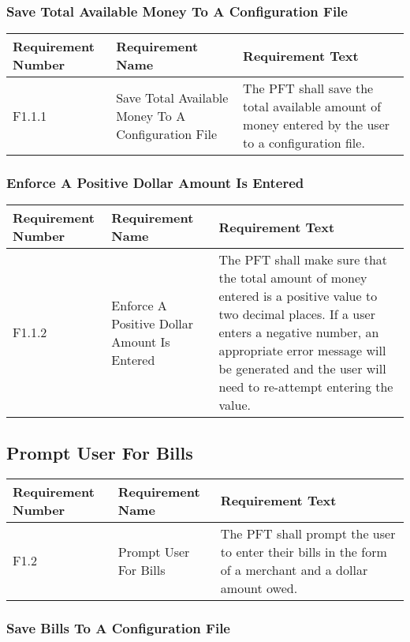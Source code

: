 \documentclass{article}
\begin{document}
\subsubsection{Save Total Available Money To A Configuration File}

\begin{longtable}{|p{2cm}|p{6cm}| p{6cm}|}
    \hline
    \textbf{Requirement Number} & \textbf{Requirement Name} & \textbf{Requirement Text}\\
    \hline
    F1.1.1 & Save Total Available Money To A Configuration File & The PFT shall save the total available amount of money entered by the user to a configuration file. \\
    \hline
\end{longtable}

\subsubsection{Enforce A Positive Dollar Amount Is Entered}

\begin{longtable}{|p{2cm}|p{6cm}| p{6cm}|}
    \hline
    \textbf{Requirement Number} & \textbf{Requirement Name} & \textbf{Requirement Text}\\
    \hline
    F1.1.2 & Enforce A Positive Dollar Amount Is Entered & The PFT shall make sure that the total amount of money entered is a positive value to two decimal places. If a user enters a negative number, an appropriate error message will be generated and the user will need to re-attempt entering the value. \\
    \hline
\end{longtable}

\subsection{Prompt User For Bills}

\begin{longtable}{|p{2cm}|p{6cm}| p{6cm}|}
    \hline
    \textbf{Requirement Number} & \textbf{Requirement Name} & \textbf{Requirement Text}\\
    \hline
    F1.2 & Prompt User For Bills & The PFT shall prompt the user to enter their bills in the form of a merchant and a dollar amount owed. \\
    \hline
\end{longtable}

\subsubsection{Save Bills To A Configuration File}
\end{document}
